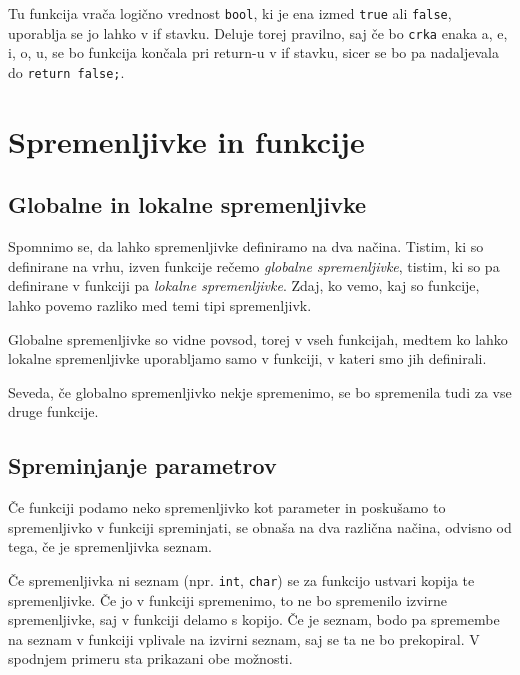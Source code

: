 Tu funkcija vrača logično vrednost \verb+bool+, ki je ena izmed \verb+true+ ali
\verb+false+, uporablja se jo lahko v if stavku. Deluje torej pravilno, saj če
bo \verb+crka+ enaka a, e, i, o, u, se bo funkcija končala pri return-u v if
stavku, sicer se bo pa nadaljevala do \verb+return false;+.


\section{Spremenljivke in funkcije}

\subsection{Globalne in lokalne spremenljivke}

Spomnimo se, da lahko spremenljivke definiramo na dva načina.
Tistim, ki so definirane na vrhu, izven funkcije rečemo \emph{globalne
spremenljivke}, tistim, ki so pa definirane v funkciji pa \emph{lokalne
spremenljivke}. Zdaj, ko vemo, kaj so funkcije, lahko povemo razliko med temi
tipi spremenljivk.

Globalne spremenljivke so vidne povsod, torej v vseh funkcijah, medtem ko lahko
lokalne spremenljivke uporabljamo samo v funkciji, v kateri smo jih definirali.

\begin{examples}
\end{examples}

Seveda, če globalno spremenljivko nekje spremenimo, se bo spremenila tudi za
vse druge funkcije.

\subsection{Spreminjanje parametrov}

Če funkciji podamo neko spremenljivko kot
parameter in poskušamo to spremenljivko v funkciji spreminjati, se obnaša na
dva različna načina, odvisno od tega, če je spremenljivka seznam.

Če spremenljivka ni seznam (npr. \verb+int+, \verb+char+) se za funkcijo
ustvari kopija te spremenljivke. Če jo v funkciji spremenimo, to ne bo
spremenilo izvirne spremenljivke, saj v funkciji delamo s kopijo. Če je seznam,
bodo pa spremembe na seznam v funkciji vplivale na izvirni seznam, saj se ta ne
bo prekopiral. V spodnjem primeru sta prikazani obe možnosti.

